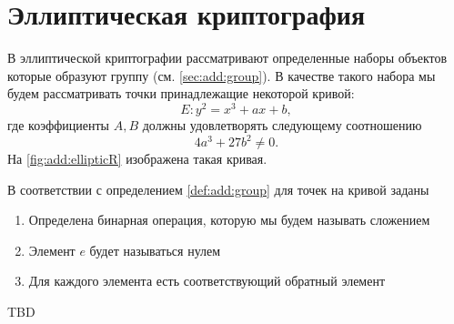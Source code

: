 \section{Эллиптическая криптография}

В эллиптической криптографии рассматривают определенные наборы
объектов которые образуют группу (см. \autoref{sec:add:group}). В
качестве такого набора мы будем рассматривать точки принадлежащие
некоторой кривой: 
\[
E: y^2 = x^3 +a x + b,
\]
где коэффициенты $A,B$ должны удовлетворять следующему соотношению
\[
4 a^3 + 27 b^2 \ne 0.
\]
На \autoref{fig:add:ellipticR} изображена такая кривая.




В соответствии с определением \ref{def:add:group} для точек на кривой 
заданы 
\begin{enumerate}
\item Определена бинарная операция, которую мы будем называть сложением
\item Элемент $e$ будет называться нулем
\item Для каждого элемента есть соответствующий обратный элемент
\end{enumerate}
TBD
